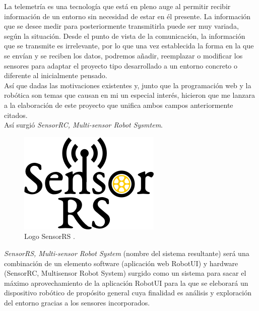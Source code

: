 La telemetría es una tecnología que está en pleno auge al permitir recibir información de un entorno sin necesidad de estar en él presente. 
La información que se desee medir para posteriormente transmitirla puede ser muy variada, según la situación. Desde el punto de vista de la comunicación, la información que se 
transmite es irrelevante, por lo que una vez establecida la forma en la que se envían y se reciben los datos, podremos añadir, reemplazar o modificar los sensores para adaptar el
proyecto tipo desarrollado a un entorno concreto o diferente al inicialmente pensado.\\

Así que dadas las motivaciones existentes y, junto que la programación web y la robótica son temas que causan en mi un especial interés, hicieron que me lanzara a la elaboración de este
proyecto que unifica ambos campos anteriormente citados.\\

Así surgió \emph{SensorRC, Multi-sensor Robot Sysmtem}.\\

\begin{figure}[H]
  \begin{center}
    \includegraphics[scale=0.8]{imagenes/logotipo_sensor_rs.png}
  \end{center}
  \label{fig:logo}
 \caption{Logo SensorRS \protect\footnotemark.}
\end{figure}


\emph{SensorRS, Multi-sensor Robot System} (nombre del sistema resultante) será una combinación de un elemento software (aplicación web RobotUI) y hardware (SensorRC, Multisensor
Robot System) surgido como un sistema para sacar el máximo aprovechamiento de la aplicación RobotUI para la que se eleborará un dispositivo robótico de propósito general cuya finalidad es
análisis y exploración del entorno gracias a los sensores incorporados.\\


